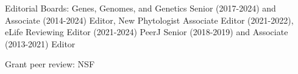 \documentclass[letterpaper,10pt]{article}
\newcommand{\ignore}[1]{}
\renewenvironment{itemize}{
  \begin{list}{}{
    \setlength{\leftmargin}{1.5em}
  }
}{
  \end{list}
}
\begin{document}
\begin{itemize}
\item Editorial Boards:
Genes, Genomes, and Genetics Senior (2017-2024) and Associate (2014-2024) Editor, %
New Phytologist Associate Editor (2021-2022),  %
eLife Reviewing Editor (2021-2024)
PeerJ Senior (2018-2019) and Associate (2013-2021) Editor
\item Grant peer review: NSF \ignore{1/21}

\end{itemize}
\end{document}
